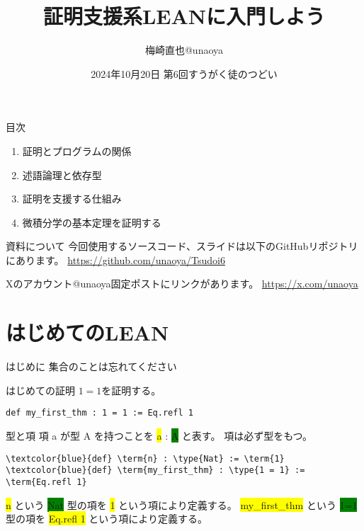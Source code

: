 \documentclass[unicode,12pt]{beamer}%
\title{証明支援系LEANに入門しよう}
\author{梅崎直也@unaoya}
\date{2024年10月20日 第6回すうがく徒のつどい}
\newcommand{\type}[1]{\colorbox{green}{#1}}
\newcommand{\term}[1]{\colorbox{yellow}{#1}}
\begin{document}
\begin{frame}
  \maketitle
\end{frame}

\begin{frame}{目次}
  \begin{enumerate}
    \item 証明とプログラムの関係
    \item 述語論理と依存型
    \item 証明を支援する仕組み
    \item 微積分学の基本定理を証明する
  \end{enumerate}
\end{frame}

\begin{frame}{資料について}
  今回使用するソースコード、スライドは以下のGitHubリポジトリにあります。
  \url{https://github.com/unaoya/Tsudoi6}

  Xのアカウント@unaoya固定ポストにリンクがあります。
  \url{https://x.com/unaoya}
\end{frame}

\section{はじめてのLEAN}

\begin{frame}{はじめに}
  \large{集合のことは忘れてください}
\end{frame}

\begin{frame}[fragile]{はじめての証明}
  $1=1$を証明する。

  \begin{tcolorbox}[title=FirstTheorem.lean]
  \setlength{\baselineskip}{12pt}
  \begin{Verbatim}[commandchars=\\\{\}]
def my_first_thm : 1 = 1 := Eq.refl 1
  \end{Verbatim}
  \end{tcolorbox}
\end{frame}

\begin{frame}[fragile]{型と項}
  項 a が型 A を持つことを \term{a} : \type{A} と表す。
  項は必ず型をもつ。
  
  \pause

  \begin{tcolorbox}[title=FirstTheorem.lean]
  \setlength{\baselineskip}{12pt}
  \begin{Verbatim}[commandchars=\\\{\}, baselinestretch=1.5]
\textcolor{blue}{def} \term{n} : \type{Nat} := \term{1}    
\textcolor{blue}{def} \term{my_first_thm} : \type{1 = 1} := \term{Eq.refl 1}    
  \end{Verbatim}
  \end{tcolorbox}  

  \term{n} という \type{Nat} 型の項を \term{1} という項により定義する。
  \term{my\_first\_thm} という \type{1=1} 型の項を \term{Eq.refl 1} という項により定義する。
\end{frame}
\end{document}
